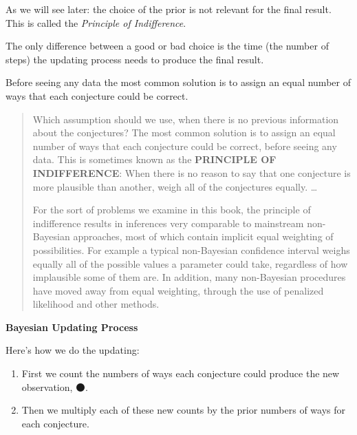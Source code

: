 \documentclass[
  letterpaper,
  DIV=11,
  numbers=noendperiod]{scrreprt}
\providecommand{\tightlist}{%
  \setlength{\itemsep}{0pt}\setlength{\parskip}{0pt}}\usepackage{longtable,booktabs,array}
\begin{document}
\begin{tcolorbox}[enhanced jigsaw, colframe=quarto-callout-tip-color-frame, colback=white, toprule=.15mm, breakable, arc=.35mm, bottomtitle=1mm, colbacktitle=quarto-callout-tip-color!10!white, toptitle=1mm, titlerule=0mm, title=\textcolor{quarto-callout-tip-color}{\faLightbulb}\hspace{0.5em}{Principle of Indifference}, leftrule=.75mm, opacityback=0, rightrule=.15mm, opacitybacktitle=0.6, bottomrule=.15mm, left=2mm, coltitle=black]

As we will see later: the choice of the prior is not relevant for the
final result. This is called the \emph{Principle of Indifference}.

The only difference between a good or bad choice is the time (the number
of steps) the updating process needs to produce the final result.

Before seeing any data the most common solution is to assign an equal
number of ways that each conjecture could be correct.

\end{tcolorbox}

\begin{quote}
Which assumption should we use, when there is no previous information
about the conjectures? The most common solution is to assign an equal
number of ways that each conjecture could be correct, before seeing any
data. This is sometimes known as the \textbf{PRINCIPLE OF INDIFFERENCE}:
When there is no reason to say that one conjecture is more plausible
than another, weigh all of the conjectures equally. \ldots{}

For the sort of problems we examine in this book, the principle of
indifference results in inferences very comparable to mainstream
non-Bayesian approaches, most of which contain implicit equal weighting
of possibilities. For example a typical non-Bayesian confidence interval
weighs equally all of the possible values a parameter could take,
regardless of how implausible some of them are. In addition, many
non-Bayesian procedures have moved away from equal weighting, through
the use of penalized likelihood and other methods.
\end{quote}

\textbf{Bayesian Updating Process}

Here's how we do the updating:

\begin{enumerate}
\def\labelenumi{\arabic{enumi}.}
\tightlist
\item
  First we count the numbers of ways each conjecture could produce the
  new observation, ⚫.
\item
  Then we multiply each of these new counts by the prior numbers of ways
  for each conjecture.
\end{enumerate}
\end{document}
